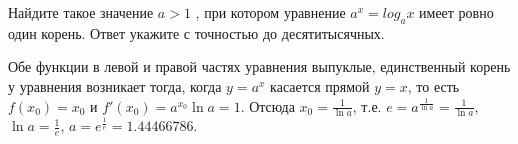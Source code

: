 
Найдите такое значение $a > 1$ , при котором уравнение $a^x=log_ax$ имеет ровно один корень. Ответ укажите с точностью до десятитысячных.

\solutionSection

Обе функции в левой и правой частях уравнения выпуклые, единственный корень у уравнения возникает тогда, когда $y = a^x$ касается прямой $y = x$, то есть $f(x_0) = x_0$ и $f'(x_0) = a^{x_0} \ln a = 1$. Отсюда $x_0 = \frac{1}{\ln a}$, т.е. $e = a^{\frac{1}{\ln a}} = \frac{1}{\ln a}$, $\ln a = \frac{1}{e}$, $a = e^{\frac{1}{e}} = 1.44466786$.

